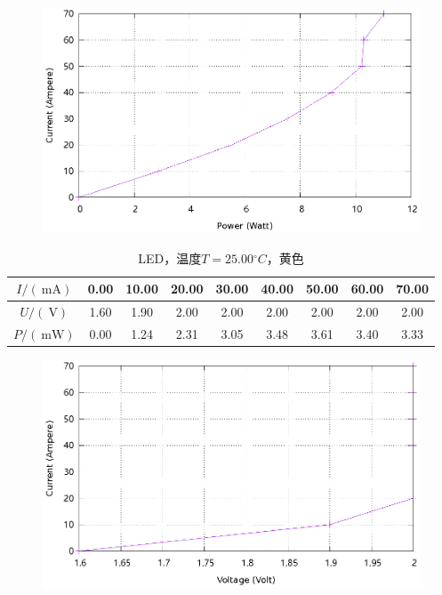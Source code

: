 \documentclass{ctexart}
\newcommand{\si}[1]{\  \mathrm{#1}}
\begin{document}
\begin{figure}[H]
    \centering
    \includegraphics[width=0.9\linewidth]{../output/led-pc-2.gnuplot}
\end{figure}
\newpage
\begin{table}[H]
    \centering
    \begin{tabular}{|c|c|c|c|c|c|c|c|c|}
        \hline
        $I/(\si{mA})$ & 0.00 & 10.00 & 20.00 & 30.00 & 40.00 & 50.00 & 60.00 & 70.00 \\\hline
        $U / (\si{V})$  & 1.60 & 1.90 & 2.00 & 2.00 & 2.00 & 2.00 & 2.00 & 2.00 \\\hline
        $P / (\si{mW})$ & 0.00 & 1.24 & 2.31 & 3.05 & 3.48 & 3.61 & 3.40 & 3.33 \\\hline
    \end{tabular}
    \caption{LED，温度$T=25.00{}^{\circ}C$，黄色}
\end{table}
\begin{figure}[H]
    \centering
    \includegraphics[width=0.9\linewidth]{../output/led-vc-3.gnuplot}
\end{figure}
\end{document}
